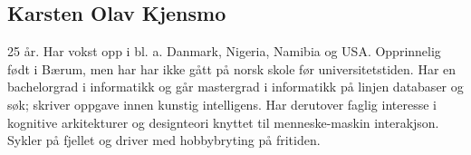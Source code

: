 \subsection{Karsten Olav Kjensmo}

25 år. Har vokst opp i bl. a. Danmark, Nigeria, Namibia og USA. Opprinnelig født i Bærum, men har har ikke gått på norsk skole før universitetstiden. Har en bachelorgrad i informatikk og går mastergrad i informatikk på linjen databaser og søk; skriver oppgave innen kunstig intelligens. Har derutover faglig interesse i kognitive arkitekturer og designteori knyttet til menneske-maskin interakjson. Sykler på fjellet og driver med hobbybryting på fritiden.

